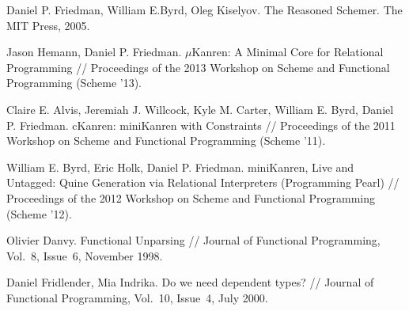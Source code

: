 \documentclass[10pt, oneside, nocopyrightspace]{sigplanconf}
\begin{document}
\begin{thebibliography}{99}
Daniel P. Friedman, William E.Byrd, Oleg Kiselyov. The Reasoned Schemer. The MIT
Press, 2005.

Jason Hemann, Daniel P. Friedman. $\mu$Kanren: A Minimal Core for Relational Programming //
Proceedings of the 2013 Workshop on Scheme and Functional Programming (Scheme '13).

Claire E. Alvis, Jeremiah J. Willcock, Kyle M. Carter, William E. Byrd, Daniel P. Friedman.
cKanren: miniKanren with Constraints // 
Proceedings of the 2011 Workshop on Scheme and Functional Programming (Scheme '11).

William E. Byrd, Eric Holk, Daniel P. Friedman.
miniKanren, Live and Untagged: Quine Generation via Relational Interpreters (Programming Pearl) //
Proceedings of the 2012 Workshop on Scheme and Functional Programming (Scheme '12).

\begin{comment}
\bibitem{Implicits}
Leo White, Fr\'ed\'eric Bour, Jeremy Yallop. 
Modular Implicits // Workshop on ML, 2014, arXiv:1512.01438.
\end{comment}

Olivier Danvy.
Functional Unparsing // Journal of Functional Programming, Vol.~8, Issue~6, November 1998.

Daniel Fridlender, Mia Indrika.
Do we need dependent types? // Journal of Functional Programming, Vol.~10, Issue~4, July 2000.

\begin{comment}
\bibitem{DGP}
Jeremy Gibbons. Datatype-generic Programming //
Proceedings of the 2006 International Conference on Datatype-generic Programming.

\bibitem{Deriving}
Jeremy Yallop. 
Practical Generic Programming in OCaml // Proceedings of 2007 Workshop on ML.
\end{comment}

\begin{comment}
\bibitem{InstantGenerics}
Manuel M. T. Chakravarty, Gabriel C. Ditu, Roman Leshchinskiy. 
Instant Generics: Fast and Easy. \url{http://www.cse.unsw.edu.au/~chak/papers/CDL09.html}, 2009.

\bibitem{ALaCarte}
Wouter Swierstra. Data Types \'a la Carte  // Journal of Functional Programming, Vol.~18, Issue~4, 2008.
\end{comment}

\end{thebibliography}
\end{document}
